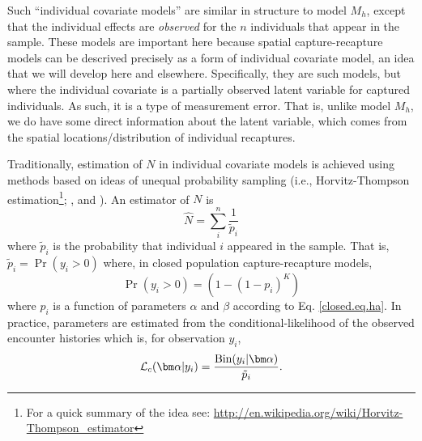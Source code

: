 Such ``individual covariate models'' are similar in structure to model
$M_{h}$, except that the individual effects are {\it observed} for the
$n$ individuals that appear in the sample. These models are important
here because spatial capture-recapture models can be descrived precisely as a form of
individual covariate model, an idea that we will develop here and
elsewhere. Specifically, they are such models, but where the
individual covariate is a partially observed latent variable for
captured individuals. As such, it is a type of measurement error.
That is, unlike model $M_h$, we do have some direct information about the
latent variable, which comes from the spatial locations/distribution
of individual recaptures.

Traditionally, estimation of $N$ in individual covariate models is
achieved using methods based on ideas of unequal probability sampling
(i.e., Horvitz-Thompson estimation\footnote{For a  quick summary of
  the idea see:
  \url{http://en.wikipedia.org/wiki/Horvitz-Thompson_estimator}};
\citet{huggins:1989},
\citet{alho:1990} and \citet{borchers_etal:2002}). An estimator of $N$ is
\[
\hat{N} = \sum_{i}^{n} \frac{1}{\tilde{p}_{i}}
\]
where $\tilde{p}_{i}$ is the probability that individual $i$ appeared
in the sample.  That is, $\tilde{p}_{i} = \Pr(y_{i}>0)$
where, in closed population capture-recapture models,
\[
\Pr(y_{i}>0) = (1- (1-p_{i})^K)
\]
where $p_{i}$ is a function of parameters $\alpha$ and $\beta$
according to Eq. \ref{closed.eq.ha}.  In practice, parameters are
estimated from the conditional-likelihood of the observed encounter
histories which is, for observation $y_{i}$,
\[
{\cal L}_{c}( {\bm \alpha} | y_{i}) = \frac{ \mbox{Bin}(y_{i}|{\bm \alpha}) } { \tilde{p}_{i}}.
\]

